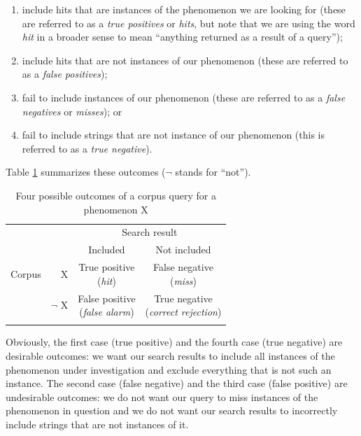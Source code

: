 \begin{enumerate}
\item include hits that are instances of the phenomenon we are looking for (these are referred to as a \textit{true positives} or \textit{hits}, but note that we are using the word \textit{hit} in a broader sense to mean ``anything returned as a result of a query'');
\item include hits that are not instances of our phenomenon (these are referred to as a \textit{false positives});
\item fail to include instances of our phenomenon (these are referred to as a \textit{false negatives} or \textit{misses}); or
\item fail to include strings that are not instance of our phenomenon (this is referred to as a \textit{true negative}).
\end{enumerate}

Table \ref{tab:queryoutcomes} summarizes these outcomes ($\lnot$ stands for ``not'').

\begin{table}[!htbp]
\caption{Four possible outcomes of a corpus query for a phenomenon X}
\label{tab:queryoutcomes}
\begin{tabular}[t]{lrcc}
\lsptoprule
       &         & \multicolumn{2}{c}{Search result} \\
       &         & Included   & Not included       \\
\midrule
Corpus  &  X     & \makecell[t]{True positive \\ \footnotesize{(\textit{hit})}}  &  \makecell[t]{False negative \\ \footnotesize{(\textit{miss})}} \\
        &  $\lnot$ X & \makecell[t]{False positive \\ \footnotesize{(\textit{false alarm})}}         &  \makecell[t]{True negative \\ \footnotesize{(\textit{correct rejection})}} \\
\lspbottomrule
\end{tabular}
\end{table}

Obviously, the first case (true positive) and the fourth case (true negative) are desirable outcomes: we want our search results to include all instances of the phenomenon under investigation and exclude everything that is not such an instance. The second case (false negative) and the third case (false positive) are undesirable outcomes: we do not want our query to miss instances of the phenomenon in question and we do not want our search results to incorrectly include strings that are not instances of it.

